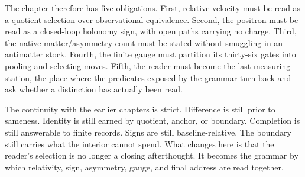 The chapter therefore has five obligations. First, relative velocity must be
read as a quotient selection over observational equivalence. Second, the
positron must be read as a closed-loop holonomy sign, with open paths carrying
no charge. Third, the native matter/asymmetry count must be stated without
smuggling in an antimatter stock. Fourth, the finite gauge must partition
its thirty-six gates into pooling and selecting moves. Fifth, the reader must
become the last measuring station, the place where the predicates exposed by
the grammar turn back and ask whether a distinction has actually been read.

The continuity with the earlier chapters is strict. Difference is still
prior to sameness. Identity is still earned by quotient, anchor, or boundary.
Completion is still answerable to finite records. Signs are still
baseline-relative. The boundary still carries what the interior cannot spend.
What changes here is that the reader's selection is no longer a closing
afterthought. It becomes the grammar by which relativity, sign, asymmetry,
gauge, and final address are read together.

